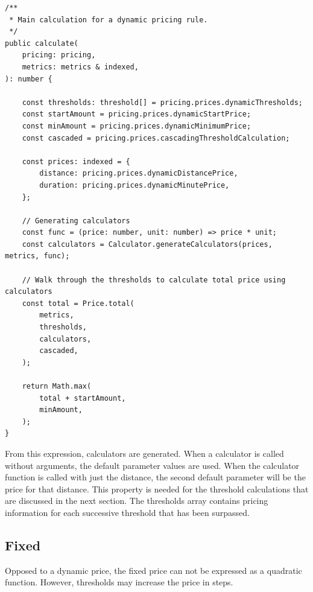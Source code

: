 \begin{minipage}{\linewidth}
\begin{lstlisting}[caption={Dynamic calculation.}, label={lst:dynamic-calculation}]
/**
 * Main calculation for a dynamic pricing rule.
 */
public calculate(
	pricing: pricing,
	metrics: metrics & indexed,
): number {

	const thresholds: threshold[] = pricing.prices.dynamicThresholds;
	const startAmount = pricing.prices.dynamicStartPrice;
	const minAmount = pricing.prices.dynamicMinimumPrice;
	const cascaded = pricing.prices.cascadingThresholdCalculation;

	const prices: indexed = {
		distance: pricing.prices.dynamicDistancePrice,
		duration: pricing.prices.dynamicMinutePrice,
	};

	// Generating calculators
	const func = (price: number, unit: number) => price * unit;
	const calculators = Calculator.generateCalculators(prices, metrics, func);

	// Walk through the thresholds to calculate total price using calculators
	const total = Price.total(
		metrics,
		thresholds,
		calculators,
		cascaded,
	);

	return Math.max(
		total + startAmount,
		minAmount,
	);
}
\end{lstlisting}
\end{minipage}

From this expression, calculators are generated. When a calculator is called without arguments, the default parameter values are used. When the calculator function is called with just the distance, the second default parameter will be the price for that distance. This property is needed for the threshold calculations that are discussed in the next section. The thresholds array contains pricing information for each successive threshold that has been surpassed.

\subsection{Fixed}
Opposed to a dynamic price, the fixed price can not be expressed as a quadratic function. However, thresholds may increase the price in steps.

